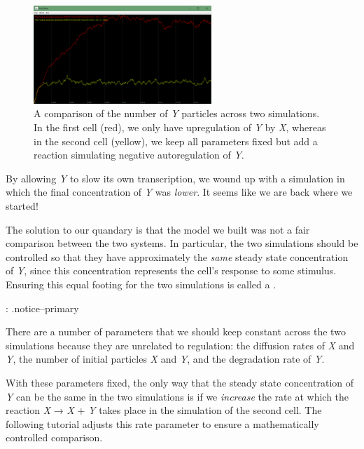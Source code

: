 \begin{figure}[h]
\centering
\mySfFamily
\includegraphics[width = 0.6\textwidth]{../images/nar_unequal_chart.png}
\caption{A comparison of the number of \textit{Y} particles across two simulations. In the first cell (red), we only have upregulation of \textit{Y} by \textit{X}, whereas in the second cell (yellow), we keep all parameters fixed but add a reaction simulating negative autoregulation of \textit{Y}.}
\label{fig:nar_unequal_chart}
\end{figure}

By allowing \textit{Y} to slow its own transcription, we wound up with a simulation in which the final concentration of \textit{Y} was \textit{lower}. It seems like we are back where we started!

The solution to our quandary is that the model we built was not a fair comparison between the two systems. In particular, the two simulations should be controlled so that they have approximately the \textit{same} steady state concentration of \textit{Y}, since this concentration represents the cell's response to some stimulus. Ensuring this equal footing for the two simulations is called a .

\begin{qbox}\end{qbox} 
{: .notice--primary}

There are a number of parameters that we should keep constant across the two simulations because they are unrelated to regulation: the diffusion rates of \textit{X} and \textit{Y}, the number of initial particles \textit{X} and \textit{Y}, and the degradation rate of \textit{Y}.

With these parameters fixed, the only way that the steady state concentration of \textit{Y} can be the same in the two simulations is if we \textit{increase} the rate at which the reaction \textit{X} → \textit{X} + \textit{Y} takes place in the simulation of the second cell. The following tutorial adjusts this rate parameter to ensure a mathematically controlled comparison.

